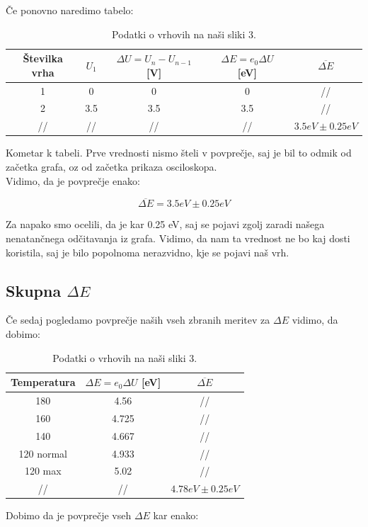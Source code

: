 \documentclass[11pt, a4paper]{article}
\theoremstyle{definition}
\theoremstyle{example}
\theoremstyle{izrek}
\begin{document}
Če ponovno naredimo tabelo: 
\begin{table}[H]
	\centering
	\begin{tabular}{|c|c|c|c|c|}
		\hline
		
		Številka vrha & $U_1$ & $\Delta U = U_{n}- U_{n-1}$ [V] & $\Delta E= e_0\Delta U $ [eV] & $\overline{\Delta E}$\\
		\hline
		\hline
		1 & 0 & 0 & 0 & //\\
		\hline
		2 & 3.5 & 3.5 & 3.5 & // \\
		\hline
		//& //& //&// & $3.5 eV \pm 0.25 eV$\\ 
		\hline
		\hline
	\end{tabular}
	\caption{Podatki o vrhovih na naši sliki 3.}		\label{26 °C}
\end{table}
Kometar k tabeli. Prve vrednosti nismo šteli v povprečje, saj je bil to odmik od začetka grafa, oz od začetka prikaza osciloskopa. \\
Vidimo, da je povprečje enako: 

$$\overline{\Delta E}=3.5 eV \pm 0.25 eV$$

Za napako smo ocelili, da je kar 0.25 eV, saj se pojavi zgolj zaradi našega nenatančnega odčitavanja iz grafa.
Vidimo, da nam ta vrednost ne bo kaj dosti koristila, saj je bilo popolnoma nerazvidno, kje se pojavi naš vrh. 

\subsection{Skupna $\Delta E$}
Če sedaj pogledamo povprečje naših vseh zbranih meritev za $\Delta E$ vidimo, da dobimo:

\begin{table}[H]
	\centering
	\begin{tabular}{|c|c|c|}
		\hline
		Temperatura  &  $\Delta E= e_0\Delta U $ [eV] & $\overline{\Delta E}$\\
		\hline
		\hline
		180  & 4.56 & //\\
		\hline
		160  & 4.725 & //\\
		\hline
		140  & 4.667 & //\\
		\hline
		120 normal  & 4.933 & //\\
		\hline
		120 max  & 5.02 & //\\
		\hline
		//&  // & $4.78 eV \pm 0.25 eV$\\ 
		\hline
		\hline
	\end{tabular}
	\caption{Podatki o vrhovih na naši sliki 3.}	
\end{table}
Dobimo da je povprečje vseh $\Delta E$ kar enako:
\end{document}
